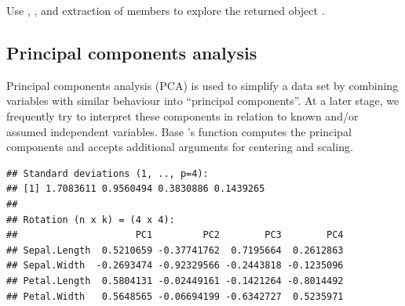 \documentclass[krantz2]{krantz}\usepackage{knitr}%
\begin{document}
\begin{advplayground}
Use , ,  and extraction of members to explore the returned object .
\end{advplayground}


\subsection{Principal components analysis}\label{sec:stat:PCA}

Principal components analysis (PCA) is used to simplify a data set by combining variables with similar behaviour into ``principal components''. At a later stage, we frequently try to interpret these components in relation to known and/or assumed independent variables. Base \Rlang's function  computes the principal components and accepts additional arguments for centering and scaling.

\begin{knitrout}\footnotesize
{}\color{fgcolor}\begin{kframe}
\begin{alltt}
 \hlkwb{<-} \hlstd{(iris[}\hlstd{(}\hlstd{,} \hlstd{,}
                    \hlstd{,} \hlstd{)],}
              \hlstd{=} \hlstd{,}
              \hlstd{=} \hlstd{)}
\end{alltt}
\end{kframe}
\end{knitrout}

\begin{knitrout}\footnotesize
{}\color{fgcolor}\begin{kframe}
\begin{alltt}
\end{alltt}
\begin{verbatim}
## Standard deviations (1, .., p=4):
## [1] 1.7083611 0.9560494 0.3830886 0.1439265
## 
## Rotation (n x k) = (4 x 4):
##                     PC1         PC2        PC3        PC4
## Sepal.Length  0.5210659 -0.37741762  0.7195664  0.2612863
## Sepal.Width  -0.2693474 -0.92329566 -0.2443818 -0.1235096
## Petal.Length  0.5804131 -0.02449161 -0.1421264 -0.8014492
## Petal.Width   0.5648565 -0.06694199 -0.6342727  0.5235971
\end{verbatim}
\end{kframe}
\end{knitrout}
\end{document}

